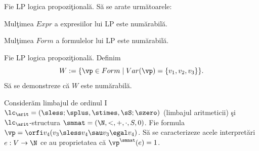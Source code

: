 \documentclass[12pt]{article}
\begin{document}
\renewcommand{\seminarno}{4}
\setcounter{exercitiuno}{0}

\titluseminarLM


\renewcommand{\solution}[1]{}

\parindent0pt


\semex
Fie LP logica propozi\c tional\u a. S\u a se arate urm\u atoarele:
\be
\item Mul\c timea $Expr$ a expresiilor lui LP este num\u arabil\u a.
\item  Mul\c timea $Form$ a formulelor lui LP este num\u arabil\u a.
\ee
\solution{
\be
\item Avem c\u{a} $Expr= \bigcup_{n\in \N} Sim^n=\{\lambda\}\cup \bigcup_{n\in\N^*} Sim^n$.  Deoarece  $Sim=V\cup\{\non, \ra, (,)\}$  
\c si $V$ este num\u arabil\u a,  ob\c tinem,   c\u{a} $|Sim|=|V|+|\{\non, \ra, (,)\}|=\aleph_0+4=\aleph_0$. Deci $Sim$ este num\u arabil\u a. 
Conform Propozi\c tiei~2.42.(i), rezult\u a c\u{a} $Sim^n$ este num\u arabil\u a pentru orice $n\geq 1$. 
Aplic\^and Propozi\c tia~2.42.(iii) 
rezult\u a c\u{a} $Expr$ este cel mult num\u arabil\u a. Deoarece $Sim\se Expr$ \c si $Sim$ este num\u arabil\u a, rezult\u a c\u{a}
 $Expr$ este, de asemenea, num\u arabil\u a. 
\item Avem c\u{a}  $V\se Form \se Expr$. Prin urmare, $\aleph_0=|V|\leq |Form|$ \c si $|Form|\leq |Expr|=\aleph_0$. Aplic\^and Teorema~Cantor-Schr\"oder-Bernstein, ob\c tinem c\u{a} $|Form|=\aleph_0$. Prin urmare, $Form$ este num\u arabil\u a.
\ee
}

\semex
Fie LP logica propozi\c tional\u a. Definim  $$W:=\{\vp \in Form \mid Var(\vp)=\{v_1, v_2, v_3\}\}.$$ 
S\u a se demonstreze c\u{a}  $W$ este num\u arabil\u a.

\solution{
Deoarece $W\se Form$, avem evident $|W|\leq |Form|=\aleph_0$.  Fie 
\[f:\N^* \to W, \quad f(n)= \underbrace{v_1\si v_1\si \ldots \si v_1}_{n\text{~or}i}.\]
Evident, $f$ este injectiv\u a, prin urmare $\aleph_0=|\N^*|\leq |W|$.
Aplic\u am acum Teorema Cantor-Schr\"oder-Bernstein pentru a ob\c tine c\u a  $|W|=\aleph_0$.
}

\semex
Consider\u am limbajul de ordinul I 
$\lc_\arit=(\sless; \splus, \stimes, \sS; \szero)$ 
(limbajul aritmeticii) \c si
$\lc_\arit$-structura $\smnat=(\N,<,+,\cdot, S, 0)$. 
Fie formula $\vp = \orfi v_4 (v_3 \sless v_4 \sau v_3 \egal v_4)$. 
S\u a se caracterizeze acele interpret\u ari $e: V \to \N$ ce au proprietatea c\u a $\vp^\smnat(e)=1$.
\end{document}
